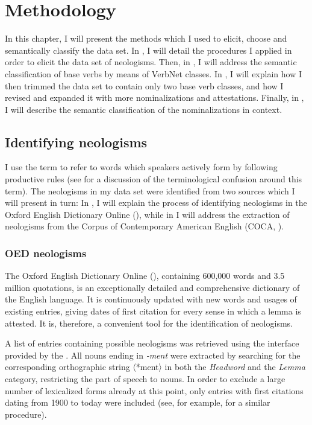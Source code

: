\chapter{Methodology}\label{ch:method}\largerpage

In this chapter, I will present the methods which I used to elicit, choose and semantically classify the data set. 
In , I will detail the procedures I applied in order to elicit the data set of \ment{} neologisms. 
Then, in , I will address the semantic classification of base verbs by means of VerbNet classes. 
In , I will explain how I  then trimmed the data set to contain only two base verb classes, and how I revised and expanded it with more nominalizations and attestations. 
Finally, in , I will describe the semantic classification of the nominalizations in context. 

\section{Identifying neologisms}
\label{sec:meth-neo}

I use the term  to refer to words which speakers actively form by following productive rules (see \citealt{Hohenhaus.2005} for a discussion of the terminological confusion around this term).
The neologisms in my data set were identified from two sources which I will present in turn: In , I will explain the process of identifying neologisms in the Oxford English Dictionary Online (), while in  I will address the extraction of neologisms from the Corpus of Contemporary American English (COCA, \citealt{Davies.2008}).

\subsection{OED neologisms}
\label{sec:meth-neo-OED}
The Oxford English Dictionary Online (), containing  600,000 words and 3.5 million quotations, is an exceptionally detailed and comprehensive dictionary of the English language. It is continuously updated with new words and usages of existing entries, giving dates of first citation for every sense in which a lemma is attested. It is, therefore, a convenient tool for the identification of neologisms.   

A list of entries containing possible neologisms was retrieved using the interface provided by the . All nouns ending in \textit{-ment} were extracted by searching for the corresponding orthographic string 〈*ment〉 in both the \textit{Headword} and the \textit{Lemma} category, restricting the part of speech to nouns. In order to exclude a large number of lexicalized forms already at this point, only entries with first citations dating from 1900 to today were included (see, for example, \citealt{Plag.1999} for a similar procedure). 

